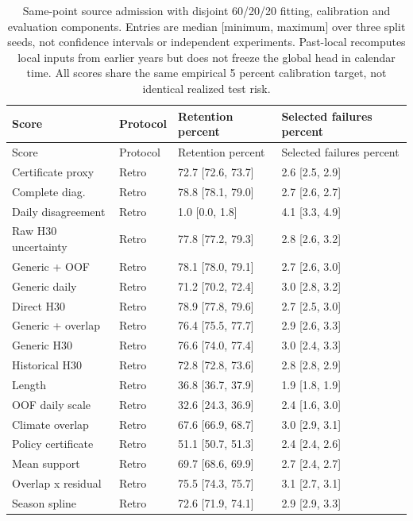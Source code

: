 {\tabletext
\setlength{\tabcolsep}{3pt}
\begin{longtable}{p{}p{}p{}p{}}
\caption{Same-point source admission with disjoint 60/20/20 fitting, calibration and evaluation components. Entries are median [minimum, maximum] over three split seeds, not confidence intervals or independent experiments. Past-local recomputes local inputs from earlier years but does not freeze the global head in calendar time. All scores share the same empirical 5 percent calibration target, not identical realized test risk.}\label{tab:r3si-ablation}\\
\toprule
Score & Protocol & Retention percent & Selected failures percent \\
\midrule
\endfirsthead
\toprule
Score & Protocol & Retention percent & Selected failures percent \\
\midrule
\endhead
Certificate proxy & Retro & 72.7 [72.6, 73.7] & 2.6 [2.5, 2.9] \\
Complete diag. & Retro & 78.8 [78.1, 79.0] & 2.7 [2.6, 2.7] \\
Daily disagreement & Retro & 1.0 [0.0, 1.8] & 4.1 [3.3, 4.9] \\
Raw H30 uncertainty & Retro & 77.8 [77.2, 79.3] & 2.8 [2.6, 3.2] \\
Generic + OOF & Retro & 78.1 [78.0, 79.1] & 2.7 [2.6, 3.0] \\
Generic daily & Retro & 71.2 [70.2, 72.4] & 3.0 [2.8, 3.2] \\
Direct H30 & Retro & 78.9 [77.8, 79.6] & 2.7 [2.5, 3.0] \\
Generic + overlap & Retro & 76.4 [75.5, 77.7] & 2.9 [2.6, 3.3] \\
Generic H30 & Retro & 76.6 [74.0, 77.4] & 3.0 [2.4, 3.3] \\
Historical H30 & Retro & 72.8 [72.8, 73.6] & 2.8 [2.8, 2.9] \\
Length & Retro & 36.8 [36.7, 37.9] & 1.9 [1.8, 1.9] \\
OOF daily scale & Retro & 32.6 [24.3, 36.9] & 2.4 [1.6, 3.0] \\
Climate overlap & Retro & 67.6 [66.9, 68.7] & 3.0 [2.9, 3.1] \\
Policy certificate & Retro & 51.1 [50.7, 51.3] & 2.4 [2.4, 2.6] \\
Mean support & Retro & 69.7 [68.6, 69.9] & 2.7 [2.4, 2.7] \\
Overlap x residual & Retro & 75.5 [74.3, 75.7] & 3.1 [2.7, 3.1] \\
Season spline & Retro & 72.6 [71.9, 74.1] & 2.9 [2.9, 3.3] \\

\end{longtable}}
